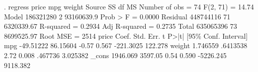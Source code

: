 . regress price mpg weight
{\smallskip}
      Source {\VBAR}       SS           df       MS      Number of obs   =        74
   F(2, 71)        =     14.74
       Model {\VBAR}   186321280         2  93160639.9   Prob > F        =    0.0000
    Residual {\VBAR}   448744116        71  6320339.67   R-squared       =    0.2934
   Adj R-squared   =    0.2735
       Total {\VBAR}   635065396        73  8699525.97   Root MSE        =      2514
{\smallskip}
       price {\VBAR}      Coef.   Std. Err.      t    P>|t|     [95\% Conf. Interval]
         mpg {\VBAR}  -49.51222   86.15604    -0.57   0.567    -221.3025     122.278
      weight {\VBAR}   1.746559   .6413538     2.72   0.008      .467736    3.025382
       _cons {\VBAR}   1946.069    3597.05     0.54   0.590    -5226.245    9118.382
{\smallskip}
